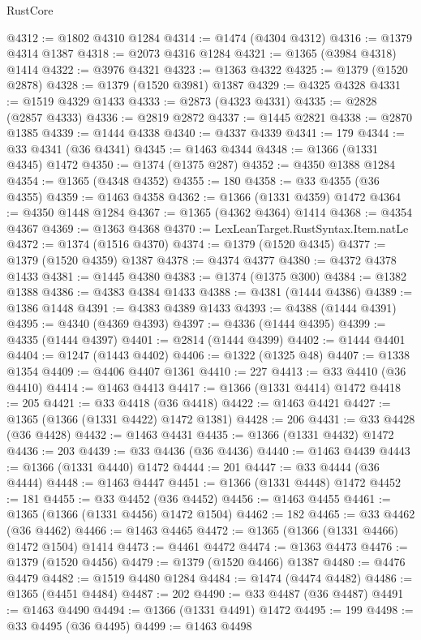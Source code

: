 \begin{lexlean}{RustCore}
\begin{coremodule}
@4312 := @1802 @4310 @1284
@4314 := @1474 (@4304 @4312)
@4316 := @1379 @4314 @1387
@4318 := @2073 @4316 @1284
@4321 := @1365 (@3984 @4318) @1414
@4322 := @3976 @4321
@4323 := @1363 @4322
@4325 := @1379 (@1520 @2878)
@4328 := @1379 (@1520 @3981) @1387
@4329 := @4325 @4328
@4331 := @1519 @4329 @1433
@4333 := @2873 (@4323 @4331)
@4335 := @2828 (@2857 @4333)
@4336 := @2819 @2872
@4337 := @1445 @2821
@4338 := @2870 @1385
@4339 := @1444 @4338
@4340 := @4337 @4339
@4341 := 179
@4344 := @33 @4341 (@36 @4341)
@4345 := @1463 @4344
@4348 := @1366 (@1331 @4345) @1472
@4350 := @1374 (@1375 @287)
@4352 := @4350 @1388 @1284
@4354 := @1365 (@4348 @4352)
@4355 := 180
@4358 := @33 @4355 (@36 @4355)
@4359 := @1463 @4358
@4362 := @1366 (@1331 @4359) @1472
@4364 := @4350 @1448 @1284
@4367 := @1365 (@4362 @4364) @1414
@4368 := @4354 @4367
@4369 := @1363 @4368
@4370 := LexLeanTarget.RustSyntax.Item.natLe
@4372 := @1374 (@1516 @4370)
@4374 := @1379 (@1520 @4345)
@4377 := @1379 (@1520 @4359) @1387
@4378 := @4374 @4377
@4380 := @4372 @4378 @1433
@4381 := @1445 @4380
@4383 := @1374 (@1375 @300)
@4384 := @1382 @1388
@4386 := @4383 @4384 @1433
@4388 := @4381 (@1444 @4386)
@4389 := @1386 @1448
@4391 := @4383 @4389 @1433
@4393 := @4388 (@1444 @4391)
@4395 := @4340 (@4369 @4393)
@4397 := @4336 (@1444 @4395)
@4399 := @4335 (@1444 @4397)
@4401 := @2814 (@1444 @4399)
@4402 := @1444 @4401
@4404 := @1247 (@1443 @4402)
@4406 := @1322 (@1325 @48)
@4407 := @1338 @1354
@4409 := @4406 @4407 @1361
@4410 := 227
@4413 := @33 @4410 (@36 @4410)
@4414 := @1463 @4413
@4417 := @1366 (@1331 @4414) @1472
@4418 := 205
@4421 := @33 @4418 (@36 @4418)
@4422 := @1463 @4421
@4427 := @1365 (@1366 (@1331 @4422) @1472 @1381)
@4428 := 206
@4431 := @33 @4428 (@36 @4428)
@4432 := @1463 @4431
@4435 := @1366 (@1331 @4432) @1472
@4436 := 203
@4439 := @33 @4436 (@36 @4436)
@4440 := @1463 @4439
@4443 := @1366 (@1331 @4440) @1472
@4444 := 201
@4447 := @33 @4444 (@36 @4444)
@4448 := @1463 @4447
@4451 := @1366 (@1331 @4448) @1472
@4452 := 181
@4455 := @33 @4452 (@36 @4452)
@4456 := @1463 @4455
@4461 := @1365 (@1366 (@1331 @4456) @1472 @1504)
@4462 := 182
@4465 := @33 @4462 (@36 @4462)
@4466 := @1463 @4465
@4472 := @1365 (@1366 (@1331 @4466) @1472 @1504) @1414
@4473 := @4461 @4472
@4474 := @1363 @4473
@4476 := @1379 (@1520 @4456)
@4479 := @1379 (@1520 @4466) @1387
@4480 := @4476 @4479
@4482 := @1519 @4480 @1284
@4484 := @1474 (@4474 @4482)
@4486 := @1365 (@4451 @4484)
@4487 := 202
@4490 := @33 @4487 (@36 @4487)
@4491 := @1463 @4490
@4494 := @1366 (@1331 @4491) @1472
@4495 := 199
@4498 := @33 @4495 (@36 @4495)
@4499 := @1463 @4498

\end{coremodule}
\end{lexlean}
